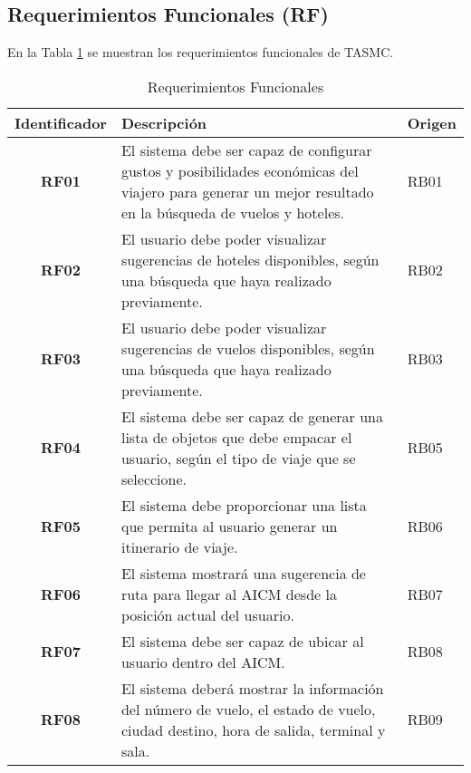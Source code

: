 \subsection{Requerimientos Funcionales (RF)}

En la Tabla \ref{tab:reqFuncionales} se muestran los requerimientos funcionales de TASMC.

\begin{table}[h]
	\begin{center}
		\begin{tabular}{|c|p{9.4cm}|p{1.5cm}|}
			\hline  \rowcolor[RGB]{51,153,255} 
				\textcolor{blanco}{\bf Identificador} &
				\textcolor{blanco}{\bf Descripción} &
				\textcolor{blanco}{\bf Origen} \\
			\hline 
				\textbf{RF01} &
				El sistema debe ser capaz de configurar gustos y posibilidades económicas del viajero para generar un mejor resultado en la búsqueda de vuelos y hoteles. &
				RB01 \\
      		\hline \rowcolor[RGB]{240,248,255}
      			\textbf{RF02} &
				El usuario debe poder visualizar sugerencias de hoteles disponibles,  según una búsqueda que haya realizado previamente. &
				RB02 \\
			\hline 
				\textbf{RF03} &
				El usuario debe poder visualizar sugerencias de vuelos disponibles, según una búsqueda que haya realizado previamente. &
				RB03 \\ 
			\hline \rowcolor[RGB]{240,248,255}
				\textbf{RF04} &
				El sistema debe ser capaz de generar una lista de objetos que debe empacar el usuario, según el tipo de viaje que se seleccione. &
				RB05 \\ 
			\hline 
				\textbf{RF05} &
				El sistema debe proporcionar una lista que permita al usuario generar un itinerario de viaje. &
				RB06 \\ 
			\hline \rowcolor[RGB]{240,248,255}
				\textbf{RF06} &
				El sistema mostrará una sugerencia de ruta para llegar al AICM desde la posición actual del usuario. &
				RB07 \\ 
			\hline 
				\textbf{RF07} &
				El sistema debe ser capaz de ubicar al usuario dentro del AICM. &
				RB08 \\ 
			\hline \rowcolor[RGB]{240,248,255}
				\textbf{RF08} &
				El sistema deberá mostrar la información del número de vuelo, el estado de vuelo, ciudad destino, hora de salida, terminal y sala. &
				RB09 \\ 
			\hline
		\end{tabular}
	\end{center}
	\caption[Requerimientos Funcionales]{Requerimientos Funcionales} 
	\label{tab:reqFuncionales}
\end{table}
\clearpage
